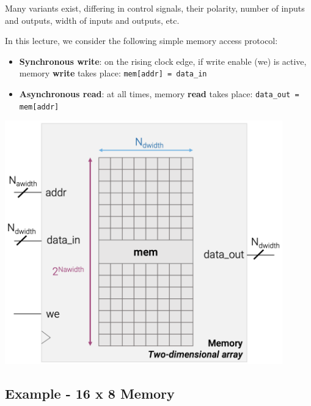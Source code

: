 \documentclass[12pt,openany]{book}
\begin{document}
	\noindent
	\begin{minipage}[htp]{0.45\textwidth}
 Many variants exist, differing in control signals, their polarity, number of inputs and outputs, width of inputs and outputs, etc.

	
	In this lecture, we consider the following simple memory access protocol:
	\begin{itemize}
		\item[] \textbf{Synchronous write}: on the rising clock edge, if write enable (we) is active, memory \textbf{write} takes place: \texttt{mem[addr] = data\_in}
		\item[] \textbf{Asynchronous read}: at all times, memory \textbf{read} takes place: \texttt{data\_out = mem[addr]}
	\end{itemize}
	\end{minipage}%
	\hfill
	\vline
	\hfill
	\begin{minipage}[htp]{0.5\textwidth}
	\centering
	\includegraphics[width=0.9\textwidth]{circuits/16.2.4.png}
	\end{minipage}

\subsection{Example - 16 x 8 Memory}
\end{document}
